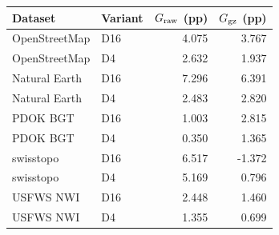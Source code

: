 \begingroup\small\setlength{\tabcolsep}{3pt}
\begin{longtable}{llrr}
\toprule
Dataset & Variant & $G_{\rm raw}$ (pp) & $G_{\rm gz}$ (pp) \\
\midrule
OpenStreetMap & D16 & 4.075 & 3.767 \\
OpenStreetMap & D4 & 2.632 & 1.937 \\
Natural Earth & D16 & 7.296 & 6.391 \\
Natural Earth & D4 & 2.483 & 2.820 \\
PDOK BGT & D16 & 1.003 & 2.815 \\
PDOK BGT & D4 & 0.350 & 1.365 \\
swisstopo & D16 & 6.517 & -1.372 \\
swisstopo & D4 & 5.169 & 0.796 \\
USFWS NWI & D16 & 2.448 & 1.460 \\
USFWS NWI & D4 & 1.355 & 0.699 \\
\bottomrule
\end{longtable}
\endgroup
